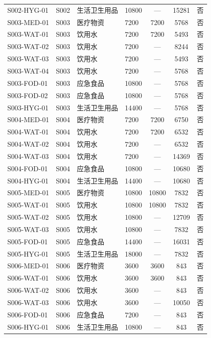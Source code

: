 \begin{center}
\begin{longtable}{llllccc}
S002-HYG-01 & S002 & 生活卫生用品 & 10800 & — & 15281 & 否 \\
S003-MED-01 & S003 & 医疗物资 & 7200 & 7200 & 5768 & 否 \\
S003-WAT-01 & S003 & 饮用水 & 7200 & 7200 & 5493 & 否 \\
S003-WAT-02 & S003 & 饮用水 & 7200 & — & 8244 & 否 \\
S003-WAT-03 & S003 & 饮用水 & 7200 & — & 5493 & 否 \\
S003-WAT-04 & S003 & 饮用水 & 7200 & — & 5768 & 否 \\
S003-FOD-01 & S003 & 应急食品 & 10800 & — & 5768 & 否 \\
S003-FOD-02 & S003 & 应急食品 & 10800 & — & 5768 & 否 \\
S003-HYG-01 & S003 & 生活卫生用品 & 14400 & — & 5768 & 否 \\
S004-MED-01 & S004 & 医疗物资 & 7200 & 7200 & 6750 & 否 \\
S004-WAT-01 & S004 & 饮用水 & 7200 & 7200 & 6532 & 否 \\
S004-WAT-02 & S004 & 饮用水 & 7200 & — & 6532 & 否 \\
S004-WAT-03 & S004 & 饮用水 & 7200 & — & 14369 & 否 \\
S004-FOD-01 & S004 & 应急食品 & 10800 & — & 10680 & 否 \\
S004-HYG-01 & S004 & 生活卫生用品 & 14400 & — & 10680 & 否 \\
S005-MED-01 & S005 & 医疗物资 & 10800 & 10800 & 7832 & 否 \\
S005-WAT-01 & S005 & 饮用水 & 10800 & 10800 & 7832 & 否 \\
S005-WAT-02 & S005 & 饮用水 & 10800 & — & 12709 & 否 \\
S005-WAT-03 & S005 & 饮用水 & 10800 & — & 7832 & 否 \\
S005-FOD-01 & S005 & 应急食品 & 14400 & — & 16031 & 否 \\
S005-HYG-01 & S005 & 生活卫生用品 & 18000 & — & 7832 & 否 \\
S006-MED-01 & S006 & 医疗物资 & 3600 & 3600 & 843 & 否 \\
S006-WAT-01 & S006 & 饮用水 & 3600 & 3600 & 843 & 否 \\
S006-WAT-02 & S006 & 饮用水 & 3600 & — & 843 & 否 \\
S006-WAT-03 & S006 & 饮用水 & 3600 & — & 10050 & 否 \\
S006-FOD-01 & S006 & 应急食品 & 7200 & — & 843 & 否 \\
S006-HYG-01 & S006 & 生活卫生用品 & 10800 & — & 843 & 否 \\

\end{longtable}
\end{center}
